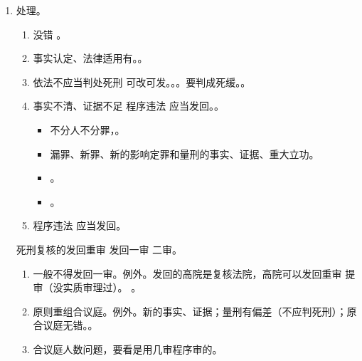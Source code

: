 \begin{enumerate}
\begin{enumerate}
\begin{enumerate}
\begin{enumerate}
                          \item 被动听。该辩的法庭上都辩完了。。
                          \item 应当将死刑复核结果通报最高检。
                        \end{enumerate}
                  \item 处理。
                        \begin{enumerate}
                          \item 没错 \yjt {}。
                          \item 事实认定、法律适用有。。
                          \item 依法不应当判处死刑 \yjt 可改可发。。。\bdy 要判成死缓。。
                          \item 事实不清、证据不足 \ydy 程序违法 \yjt 应当发回。。
                                \begin{itemize}
                                  \item 不分人不分罪，。
                                  \item 漏罪、新罪、新的影响定罪和量刑的事实、证据、重大立功。
                                  \item {}。
                                  \item {}。
                                \end{itemize}
                          \item 程序违法 \yjt 应当发回。
                        \end{enumerate}
                        \begin{kk}{死刑复核的发回重审}
                          发回一审 \hz 二审。
                          \begin{enumerate}
                            \item 一般不得发回一审。例外。发回的高院是复核法院，高院可以发回重审 \hz 提审（没实质审理过）。
                                  。
                            \item 原则重组合议庭。例外。新的事实、证据；量刑有偏差（不应判死刑）；原合议庭无错。。
                            \item 合议庭人数问题，要看是用几审程序审的。

\end{enumerate}
\end{kk}
\end{enumerate}
\end{enumerate}
\end{enumerate}
